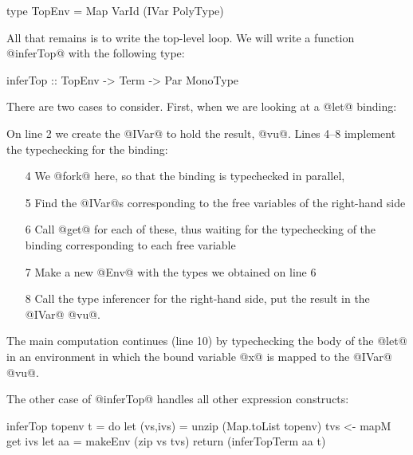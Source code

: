 \begin{haskell}
type TopEnv = Map VarId (IVar PolyType)
\end{haskell}

All that remains is to write the top-level loop.  We will write a
function @inferTop@ with the following type:

\begin{haskell}
inferTop :: TopEnv -> Term -> Par MonoType
\end{haskell}

\noindent There are two cases to consider.  First, when we are looking at a
@let@ binding:


\noindent On line 2 we create the @IVar@ to hold the result, @vu@.  Lines
4--8 implement the typechecking for the binding:

\begin{itemize}
\item [4] We @fork@ here, so that the binding is typechecked in
  parallel,
\item [5] Find the @IVar@s corresponding to the free variables of the right-hand side
\item [6] Call @get@ for each of these, thus waiting for the
  typechecking of the binding corresponding to each free variable
\item [7] Make a new @Env@ with the types we obtained on line 6
\item [8] Call the type inferencer for the right-hand side, put the
  result in the @IVar@ @vu@.
\end{itemize}

The main computation continues (line 10) by typechecking the body of
the @let@ in an environment in which the bound variable @x@ is mapped
to the @IVar@ @vu@.

The other case of @inferTop@ handles all other expression constructs:

\begin{numhaskell}
inferTop topenv t = do
    let (vs,ivs) = unzip (Map.toList topenv)
    tvs <- mapM get ivs
    let aa = makeEnv (zip vs tvs)
    return (inferTopTerm aa t)
\end{numhaskell}

